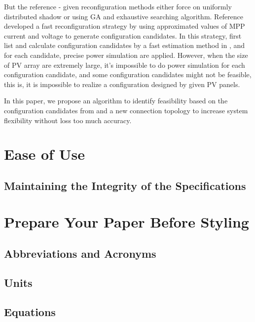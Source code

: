 \documentclass[conference]{IEEEtran}
\begin{document}
But the reference \cite{carotenuto2015evolutionary}-\cite{iraji2017optimisation} given reconfiguration methods either force on uniformly distributed shadow or using GA and exhaustive searching algorithm. Reference \cite{orozco2016optimized} developed a fast reconfiguration strategy by using approximated values of MPP current and voltage to generate configuration candidates. In this strategy, first list and calculate configuration candidates by a fast estimation method in \cite{orozco2015fast}, and for each candidate, precise power simulation are applied. However, when the size of PV array are extremely large, it's impossible to do power simulation for each configuration candidate, and some configuration candidates might not be feasible, this is, it is impossible to realize a configuration designed by given PV panels.

In this paper, we propose an algorithm to identify feasibility based on the configuration candidates from \cite{orozco2016optimized} and a new connection topology to increase system flexibility without loss too much accuracy. 

\section{Ease of Use}

\subsection{Maintaining the Integrity of the Specifications}

\section{Prepare Your Paper Before Styling}

\subsection{Abbreviations and Acronyms}\label{AA}

\subsection{Units}



\subsection{Equations}
\end{document}
